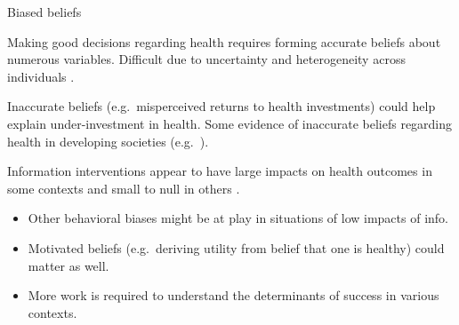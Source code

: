 \documentclass[aspectratio=169, 10pt, handout]{beamer}
\newenvironment{wideitemize}{\itemize\addtolength{\itemsep}{10pt}}{\enditemize}
\begin{document}
\begin{frame}{Biased beliefs}

\begin{wideitemize}

	\item Making good decisions regarding health requires forming accurate beliefs about numerous variables. Difficult due to uncertainty and heterogeneity across individuals \citep{arrow1963uncertainty}.
	
	\item Inaccurate beliefs (e.g.\ misperceived returns to health investments) could help explain under-investment in health. Some evidence of inaccurate beliefs regarding health in developing societies (e.g.\ \cite{delavande2009subjective,godlonton2016responding}).

	\item Information interventions appear to have large impacts on health outcomes in some contexts and small to null in others \cite{dupas2011health,dupas2017impacts}. 
	
	\begin{itemize}
	    
	    \item Other behavioral biases might be at play in situations of low impacts of info.
	    
	    \item Motivated beliefs (e.g.\ deriving utility from belief that one is healthy) could matter as well.
	    
	    \item More work is required to understand the determinants of success in various contexts.
	    
	\end{itemize}
	
\end{wideitemize}

\end{frame}
\end{document}
